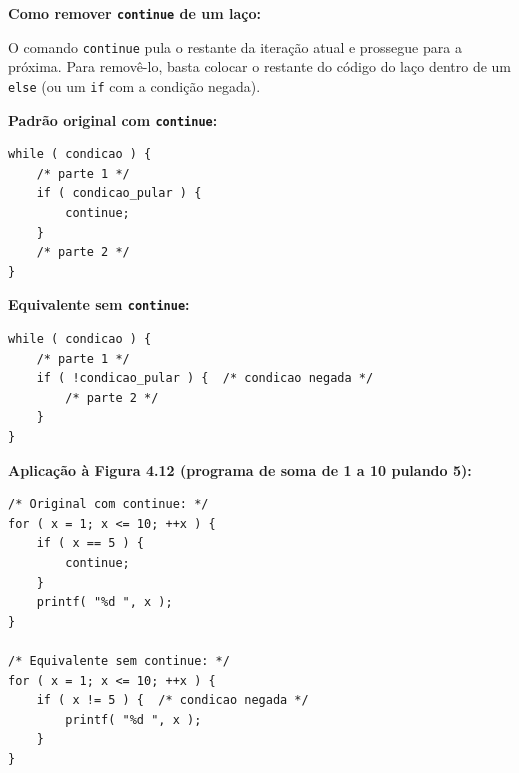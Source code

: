\documentclass[12pt,a4paper]{article}
\begin{document}
\begin{respostabox}
\textbf{Como remover \texttt{continue} de um laço:}

O comando \texttt{continue} pula o restante da iteração atual e prossegue para a
próxima. Para removê-lo, basta colocar o restante do código do laço dentro de um
\texttt{else} (ou um \texttt{if} com a condição negada).

\textbf{Padrão original com \texttt{continue}:}
\begin{lstlisting}
while ( condicao ) {
    /* parte 1 */
    if ( condicao_pular ) {
        continue;
    }
    /* parte 2 */
}
\end{lstlisting}

\textbf{Equivalente sem \texttt{continue}:}
\begin{lstlisting}
while ( condicao ) {
    /* parte 1 */
    if ( !condicao_pular ) {  /* condicao negada */
        /* parte 2 */
    }
}
\end{lstlisting}

\textbf{Aplicação à Figura 4.12 (programa de soma de 1 a 10 pulando 5):}
\begin{lstlisting}
/* Original com continue: */
for ( x = 1; x <= 10; ++x ) {
    if ( x == 5 ) {
        continue;
    }
    printf( "%d ", x );
}

/* Equivalente sem continue: */
for ( x = 1; x <= 10; ++x ) {
    if ( x != 5 ) {  /* condicao negada */
        printf( "%d ", x );
    }
}
\end{lstlisting}
\end{respostabox}
\end{document}
